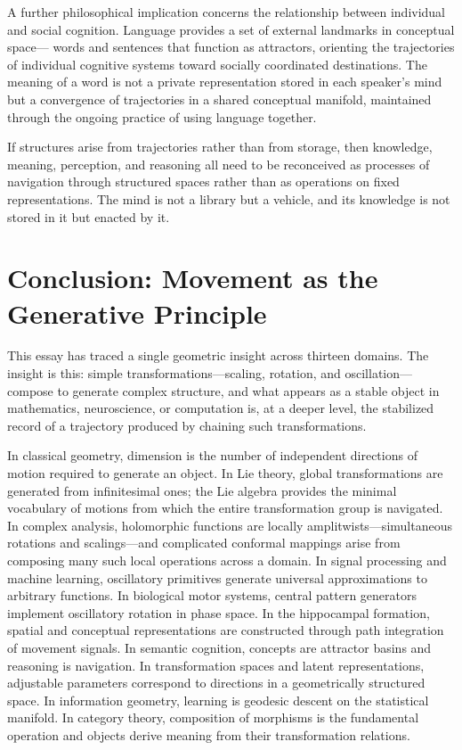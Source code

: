 \documentclass[11pt, a4paper]{article}
\theoremstyle{plain}
\theoremstyle{definition}
\theoremstyle{remark}
\begin{document}
A further philosophical implication concerns the relationship between individual and
social cognition. Language provides a set of external landmarks in conceptual space---
words and sentences that function as attractors, orienting the trajectories of individual
cognitive systems toward socially coordinated destinations. The meaning of a word is not
a private representation stored in each speaker's mind but a convergence of trajectories
in a shared conceptual manifold, maintained through the ongoing practice of using
language together.

If structures arise from trajectories rather than from storage, then knowledge, meaning,
perception, and reasoning all need to be reconceived as processes of navigation through
structured spaces rather than as operations on fixed representations. The mind is not a
library but a vehicle, and its knowledge is not stored in it but enacted by it.


\section{Conclusion: Movement as the Generative Principle}

This essay has traced a single geometric insight across thirteen domains. The insight is
this: simple transformations---scaling, rotation, and oscillation---compose to generate
complex structure, and what appears as a stable object in mathematics, neuroscience, or
computation is, at a deeper level, the stabilized record of a trajectory produced by
chaining such transformations.

In classical geometry, dimension is the number of independent directions of motion
required to generate an object. In Lie theory, global transformations are generated from
infinitesimal ones; the Lie algebra provides the minimal vocabulary of motions from
which the entire transformation group is navigated. In complex analysis, holomorphic
functions are locally amplitwists---simultaneous rotations and scalings---and complicated
conformal mappings arise from composing many such local operations across a domain.
In signal processing and machine learning, oscillatory primitives generate universal
approximations to arbitrary functions. In biological motor systems, central pattern
generators implement oscillatory rotation in phase space. In the hippocampal formation,
spatial and conceptual representations are constructed through path integration of
movement signals. In semantic cognition, concepts are attractor basins and reasoning is
navigation. In transformation spaces and latent representations, adjustable parameters
correspond to directions in a geometrically structured space. In information geometry,
learning is geodesic descent on the statistical manifold. In category theory, composition
of morphisms is the fundamental operation and objects derive meaning from their
transformation relations.
\end{document}
